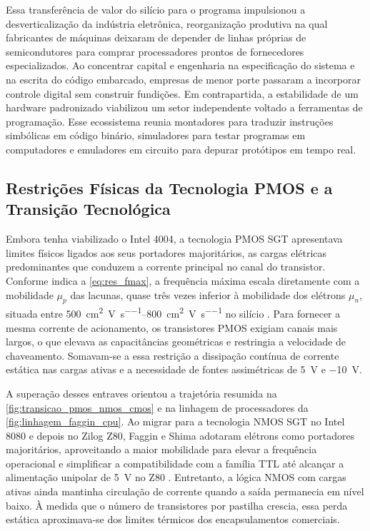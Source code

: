 Essa transferência de valor do silício para o programa impulsionou a desverticalização da indústria eletrônica, reorganização produtiva na qual fabricantes de máquinas deixaram de depender de linhas próprias de semicondutores para comprar processadores prontos de fornecedores especializados. Ao concentrar capital e engenharia na especificação do sistema e na escrita do código embarcado, empresas de menor porte passaram a incorporar controle digital sem construir fundições. Em contrapartida, a estabilidade de um hardware padronizado viabilizou um setor independente voltado a ferramentas de programação. Esse ecossistema reunia montadores para traduzir instruções simbólicas em código binário, simuladores para testar programas em computadores e emuladores em circuito para depurar protótipos em tempo real.

\subsection{Restrições Físicas da Tecnologia PMOS e a Transição Tecnológica}
\label{subsec:limitacoes_pmos_nmos}

Embora tenha viabilizado o Intel 4004, a tecnologia PMOS SGT apresentava limites físicos ligados aos seus portadores majoritários, as cargas elétricas predominantes que conduzem a corrente principal no canal do transistor. Conforme indica a \cref{eq:res_fmax}, a frequência máxima escala diretamente com a mobilidade $\mu_p$ das lacunas, quase três vezes inferior à mobilidade dos elétrons $\mu_n$, situada entre \SIrange{500}{800}{\centi\meter\squared\per\volt\per\second} no silício \cite{sze2006}. Para fornecer a mesma corrente de acionamento, os transistores PMOS exigiam canais mais largos, o que elevava as capacitâncias geométricas e restringia a velocidade de chaveamento. Somavam-se a essa restrição a dissipação contínua de corrente estática nas cargas ativas e a necessidade de fontes assimétricas de \SI{+5}{\volt} e \SI{-10}{\volt}.

A superação desses entraves orientou a trajetória resumida na \cref{fig:transicao_pmos_nmos_cmos} e na linhagem de processadores da \cref{fig:linhagem_faggin_cpu}. Ao migrar para a tecnologia NMOS SGT no Intel 8080 e depois no Zilog Z80, Faggin e Shima adotaram elétrons como portadores majoritários, aproveitando a maior mobilidade para elevar a frequência operacional e simplificar a compatibilidade com a família TTL até alcançar a alimentação unipolar de \SI{+5}{\volt} no Z80 \cite{faggin1996, chmz80panel2007}. Entretanto, a lógica NMOS com cargas ativas ainda mantinha circulação de corrente quando a saída permanecia em nível baixo. À medida que o número de transistores por pastilha crescia, essa perda estática aproximava-se dos limites térmicos dos encapsulamentos comerciais.


